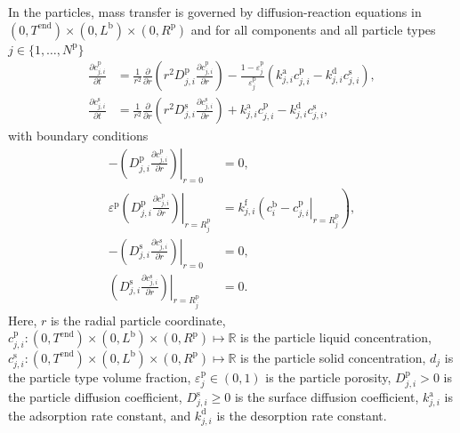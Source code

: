 \documentclass{article}
\begin{document}
In the particles, mass transfer is governed by diffusion-reaction equations in $(0, T^{\mathrm{end}}) \times (0, L^{\mathrm{b}})\times (0, R^{\mathrm{p}})$ and for all components and all particle types $j\in\{1, \dots, N^{\mathrm{p}}\}$
\begin{align}
    \frac{\partial c^{\mathrm{p}}_{j,i}}{\partial t}
    &= \frac{1}{r^{2}} \frac{\partial }{\partial r} \left( r^{2} D^{\mathrm{p}}_{j,i} \frac{\partial c^{\mathrm{p}}_{j,i}}{\partial r} \right)
        - \frac{1 - \varepsilon^{\mathrm{p}}_{j}}{\varepsilon^{\mathrm{p}}_{j}}\left(k^{\mathrm{a}}_{j,i} c^{\mathrm{p}}_{j,i} - k^{\mathrm{d}}_{j,i} c^{\mathrm{s}}_{j,i} \right),
    \\
    \frac{\partial c^{\mathrm{s}}_{j,i}}{\partial t}
    &= \frac{1}{r^{2}} \frac{\partial }{\partial r} \left( r^{2} D^{\mathrm{s}}_{j,i} \frac{\partial c^{\mathrm{s}}_{j,i}}{\partial r} \right)
        + k^{\mathrm{a}}_{j,i} c^{\mathrm{p}}_{j,i}
        - k^{\mathrm{d}}_{j,i} c^{\mathrm{s}}_{j,i},
\end{align}
with boundary conditions
\begin{align}
    - \left. \left( D^{\mathrm{p}}_{j,i} \frac{\partial c^{\mathrm{p}}_{j,i}}{\partial r} \right) \right|_{r=0}
    &= 0,
    \\
    \varepsilon^{\mathrm{p}} \left. \left( D^{\mathrm{p}}_{j,i} \frac{\partial c^{\mathrm{p}}_{j,i}}{\partial r} \right)\right|_{r = R^{\mathrm{p}}_{j}}
    &= k^{\mathrm{f}}_{j,i} \left. \left( c^{\mathrm{b}}_{i} - c^{\mathrm{p}}_{j,i} \right|_{r = R^{\mathrm{p}}_{j}} \right),
    \\
    - \left( \left. D^{\mathrm{s}}_{j,i} \frac{\partial c^{\mathrm{s}}_{j,i}}{\partial r} \right) \right|_{r=0}
    &= 0,
    \\
    \left( \left. D^{\mathrm{s}}_{j,i} \frac{\partial c^{\mathrm{s}}_{j,i}}{\partial r} \right) \right|_{r = R^{\mathrm{p}}_{j}}
    &= 0.
\end{align}
Here, $r$ is the radial particle coordinate, $c^{\mathrm{p}}_{j,i}\colon (0, T^{\mathrm{end}}) \times (0, L^{\mathrm{b}})\times (0, R^{\mathrm{p}}) \mapsto \mathbb{R}$ is the particle liquid concentration, $c^{\mathrm{s}}_{j,i}\colon (0, T^{\mathrm{end}}) \times (0, L^{\mathrm{b}})\times (0, R^{\mathrm{p}}) \mapsto \mathbb{R}$ is the particle solid concentration, $d_{j}$ is the particle type volume fraction, $\varepsilon^{\mathrm{p}}_{j}\in (0, 1)$ is the particle porosity, $D^{\mathrm{p}}_{j,i}> 0$ is the particle diffusion coefficient, $D^{\mathrm{s}}_{j,i}\geq 0$ is the surface diffusion coefficient, $k^{\mathrm{a}}_{j,i}$ is the adsorption rate constant, and $k^{\mathrm{d}}_{j,i}$ is the desorption rate constant.
\end{document}
